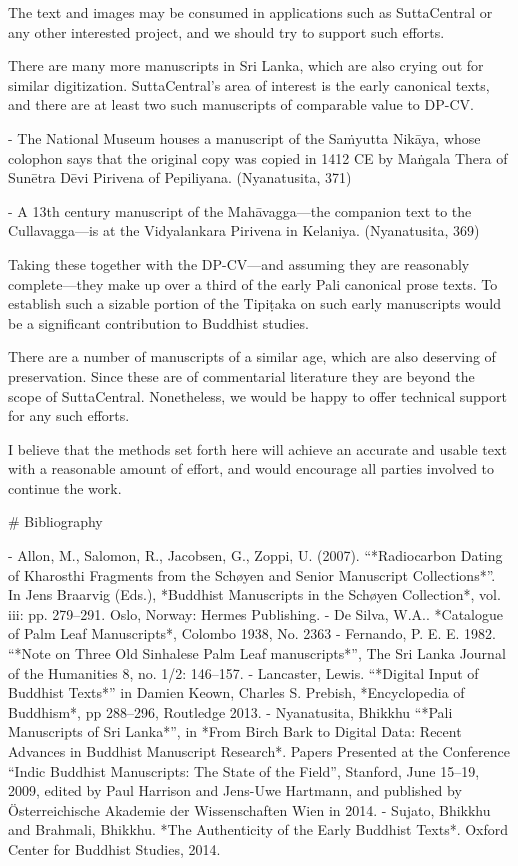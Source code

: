 \documentclass[11pt, openany,a5paper]{article}
\begin{document}
\begin{markdown}
The text and images may be consumed in applications such as SuttaCentral or any other interested project, and we should try to support such efforts.

There are many more manuscripts in Sri Lanka, which are also crying out for similar digitization. SuttaCentral’s area of interest is the early canonical texts, and there are at least two such manuscripts of comparable value to DP-CV.

- The National Museum houses a manuscript of the Saṁyutta Nikāya, whose colophon says that the original copy was copied in 1412 CE by Maṅgala Thera of Sunētra Dēvi Pirivena of Pepiliyana. (Nyanatusita, 371)

- A 13th century manuscript of the Mahāvagga—the companion text to the Cullavagga—is at the Vidyalankara Pirivena in Kelaniya. (Nyanatusita, 369)

Taking these together with the DP-CV—and assuming they are reasonably complete—they make up over a third of the early Pali canonical prose texts. To establish such a sizable portion of the Tipiṭaka on such early manuscripts would be a significant contribution to Buddhist studies.

There are a number of manuscripts of a similar age, which are also deserving of preservation. Since these are of commentarial literature they are beyond the scope of SuttaCentral. Nonetheless, we would be happy to offer technical support for any such efforts.

I believe that the methods set forth here will achieve an accurate and usable text with a reasonable amount of effort, and would encourage all parties involved to continue the work.

# Bibliography

- Allon, M., Salomon, R., Jacobsen, G., Zoppi, U. (2007). “*Radiocarbon Dating of Kharosthi Fragments from the Schøyen and Senior Manuscript Collections*”. In Jens Braarvig (Eds.), *Buddhist Manuscripts in the Schøyen Collection*, vol. iii: pp. 279–291. Oslo, Norway: Hermes Publishing.
- De Silva, W.A.. *Catalogue of Palm Leaf Manuscripts*, Colombo 1938, No. 2363
- Fernando, P. E. E. 1982. “*Note on Three Old Sinhalese Palm Leaf manuscripts*”, The Sri Lanka Journal of the Humanities 8, no. 1/2: 146–157.
- Lancaster, Lewis. “*Digital Input of Buddhist Texts*” in Damien Keown, Charles S. Prebish, *Encyclopedia of Buddhism*, pp 288–296, Routledge 2013.
- Nyanatusita, Bhikkhu “*Pali Manuscripts of Sri Lanka*”, in *From Birch Bark to Digital Data: Recent Advances in Buddhist Manuscript Research*. Papers Presented at the Conference “Indic Buddhist Manuscripts: The State of the Field”, Stanford, June 15–19, 2009, edited by Paul Harrison and Jens-Uwe Hartmann, and published by Österreichische Akademie der Wissenschaften Wien in 2014.
- Sujato, Bhikkhu and Brahmali, Bhikkhu. *The Authenticity of the Early Buddhist Texts*. Oxford Center for Buddhist Studies, 2014.

\end{markdown}
\end{document}
